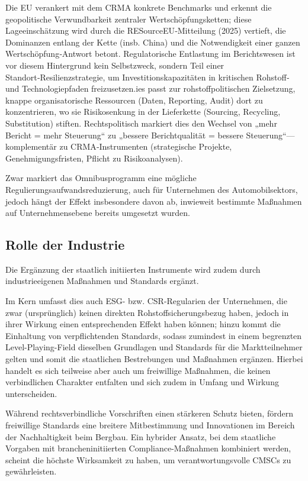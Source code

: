 \documentclass[12pt,a4paper,oneside]{book} %
\begin{document}
Die EU verankert mit dem CRMA konkrete Benchmarks  und erkennt die geopolitische Verwundbarkeit zentraler Wertschöpfungsketten; diese Lageeinschätzung wird durch die RESourceEU‑Mitteilung (2025) vertieft, die Dominanzen entlang der Kette (insb. China) und die Notwendigkeit einer ganzen Wertschöpfung‑Antwort betont. Regulatorische Entlastung im Berichtswesen ist vor diesem Hintergrund kein Selbstzweck, sondern Teil einer Standort‑Resilienzstrategie, um Investitionskapazitäten in kritischen Rohstoff‑ und Technologiepfaden freizusetzen.ies passt zur rohstoffpolitischen Zielsetzung, knappe organisatorische Ressourcen (Daten, Reporting, Audit) dort zu konzentrieren, wo sie Risikosenkung in der Lieferkette (Sourcing, Recycling, Substitution) stiften. Rechtspolitisch markiert dies den Wechsel von „mehr Bericht = mehr Steuerung“ zu „bessere Berichtqualität = bessere Steuerung“—komplementär zu CRMA‑Instrumenten (strategische Projekte, Genehmigungsfristen, Pflicht zu Risikoanalysen).

Zwar markiert das Omnibusprogramm eine mögliche Regulierungsaufwandsreduzierung, auch für Unternehmen des Automobilsektors, jedoch hängt der Effekt insbesondere davon ab, inwieweit bestimmte Maßnahmen auf Unternehmensebene bereits umgesetzt wurden.\autocite{RAW 2025, 130, 133}

\subsection{Rolle der Industrie}

Die Ergänzung der staatlich initiierten Instrumente wird zudem durch industrieeigenen Maßnahmen und Standards ergänzt.

Im Kern umfasst dies auch ESG- bzw. CSR-Regularien der Unternehmen, die zwar (ursprünglich) keinen direkten Rohstoffsicherungsbezug haben, jedoch in ihrer Wirkung einen entsprechenden Effekt haben können; hinzu kommt die Einhaltung von verpflichtenden Standards, sodass zumindest in einem begrenzten Level-Playing-Field dieselben Grundlagen und Standards für die Marktteilnehmer gelten und somit die staatlichen Bestrebungen und Maßnahmen ergänzen. Hierbei handelt es sich teilweise aber auch um freiwillige Maßnahmen, die keinen verbindlichen Charakter entfalten und sich zudem in Umfang und Wirkung unterscheiden.


Während rechtsverbindliche Vorschriften einen stärkeren Schutz bieten, fördern freiwillige Standards eine breitere Mitbestimmung und Innovationen im Bereich der Nachhaltigkeit beim Bergbau. Ein hybrider Ansatz, bei dem staatliche Vorgaben mit brancheninitiierten Compliance-Maßnahmen kombiniert werden, scheint die höchste Wirksamkeit zu haben, um verantwortungsvolle CMSCs zu gewährleisten.\autocite{Resilience of Critical Minerals Supply Chain, Cambirdge, S. 29}
\end{document}
